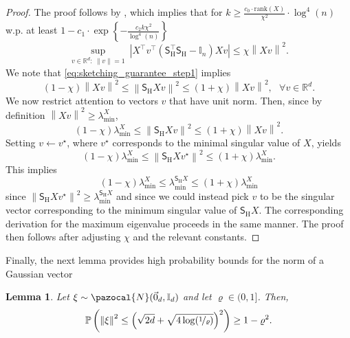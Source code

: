\documentclass[11pt]{article}
\newtheorem{lem}{Lemma}
\theoremstyle{definition}
\theoremstyle{plain}
\newcommand{\reals}{\mathbb{R}}
\providecommand{\brI}{\mathbb{I}}
\newcommand{\abs}[1]{\left| #1 \right|}
\newcommand{\Norm}[1]{\left\| #1 \right\|}
\providecommand{\norm}[1]{\Norm{#1}}
\newcommand{\pN}{\pazocal{N}}
\begin{document}
\begin{proof}
    The proof follows by \citet[Lemma.~1]{pilanci_hessiansketch}, which implies that for $k \geq \frac{c_0\cdot \mathrm{rank}(X)}{\chi^2}\cdot \log^4(n)$ w.p. at least $1 - c_1 \cdot \exp\left\{-\frac{c_2 k\chi^2}{\log^4(n)}\right\}$ 
    \begin{equation}
        \label{eq:sketching_guarantee_step1}
        \underset{v\in \reals^{d}: \ \norm{v} = 1}{\sup} \ \abs{X^{\top}v^{\top}\left(\mathsf{S}^{\top}_{\mathrm{H}}\mathsf{S}_{\mathrm{H}} - \brI_n\right)Xv} \leq \chi\norm{Xv}^2.
    \end{equation}
    We note that \eqref{eq:sketching_guarantee_step1} implies 
    \begin{equation}
        \left(1 - \chi\right)\norm{Xv}^2 \leq \norm{\mathsf{S}_{\mathrm{H}}Xv}^2 \leq \left(1 + \chi\right)\norm{Xv}^2, \ \ \ \forall v\in\reals^{d}.
    \end{equation}
    We now restrict attention to vectors $v$ that have unit norm. Then, since by definition $\norm{Xv}^2 \geq \lambda^{X}_{\min}$, 
    \begin{equation}
        \left(1 - \chi\right)\lambda^{X}_{\min} \leq \norm{\mathsf{S}_{\mathrm{H}}Xv}^2 \leq \left(1 + \chi\right)\norm{Xv}^2.
    \end{equation}
    Setting $v\gets v^{\star}$, where $v^{\star}$ corresponds to the minimal singular value of $X$, yields
    \begin{equation}
        \left(1 - \chi\right)\lambda^{X}_{\min} \leq \norm{\mathsf{S}_{\mathrm{H}}Xv^{\star}}^2 \leq \left(1 + \chi\right)\lambda^{X}_{\min}.
    \end{equation}
    This implies 
    \begin{equation}
        \left(1 - \chi\right)\lambda^{X}_{\min} \leq \lambda^{\mathsf{S}_{\mathrm{H}}X}_{\min} \leq \left(1 + \chi\right)\lambda^{X}_{\min}
    \end{equation}
    since $\norm{\mathsf{S}_{\mathrm{H}}Xv^{\star}}^2 \geq \lambda^{\mathsf{S}_{\mathrm{H}}X}_{\min}$ and since we could instead pick $v$ to be the singular vector corresponding to the minimum singular value of $\mathsf{S}_{\mathrm{H}}X$. The corresponding derivation for the maximum eigenvalue proceeds in the same manner. The proof then follows after adjusting $\chi$ and the relevant constants. 
\end{proof}
Finally, the next lemma provides high probability bounds for the norm of a Gaussian vector 
\begin{lem}
\label{lem:excess_prob_Gaussian}
    Let $\xi \sim \pN(\vec{0}_d, \brI_d)$ and let $\varrho \in (0, 1]$. Then, 
    \begin{equation}
        \mathbb{P}\left(\norm{\xi}^2 \leq \left(\sqrt{2d} + \sqrt{4\log(\nicefrac{1}{\varrho})}\right)^2\right) \geq 1 - \varrho^2. 
    \end{equation}
\end{lem}
\end{document}
